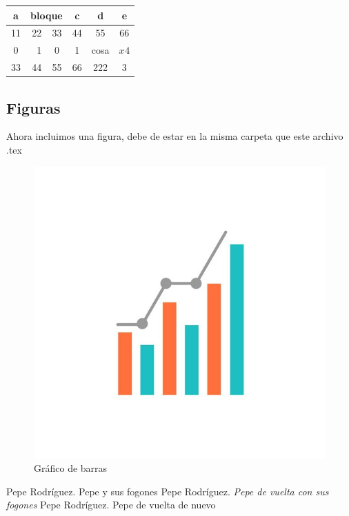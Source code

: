\documentclass[10pt,a4paper]{article}
\begin{document}
\renewcommand{\arraystretch}{1}
\begin{center}
	
	\begin{tabular}{|c|r|c|c|c|c|}
		\hline
		a & \multicolumn{2}{r|}{bloque} & c & d & e \\
		\hline
		11 & 22 & 33 & 44 & 55 & 66 \\ 
		\hline
		0 & 1 & 0 & 1 & cosa & $x^{}4$ \\
		\hline
		33 & 44 & 55 & 66 & 222 & 3 \\
		\hline
	\end{tabular}
\end{center}
                  
\subsection{Figuras}            
         
Ahora incluimos una figura, debe de estar en la misma carpeta que este archivo .tex

\begin{figure}
	\centering
	\includegraphics[width=0.5\linewidth]{grafica1}
	\caption{Gráfico de barras}
\end{figure}

\carath*
                     
\newpage                          
\begin{thebibliography}{9}
	 Pepe Rodríguez. Pepe y sus fogones       
	 Pepe Rodríguez. {\textit{Pepe de vuelta con sus fogones}}
	 Pepe Rodríguez. \textsf{Pepe de vuelta de nuevo}
\end{thebibliography}
\end{document}
